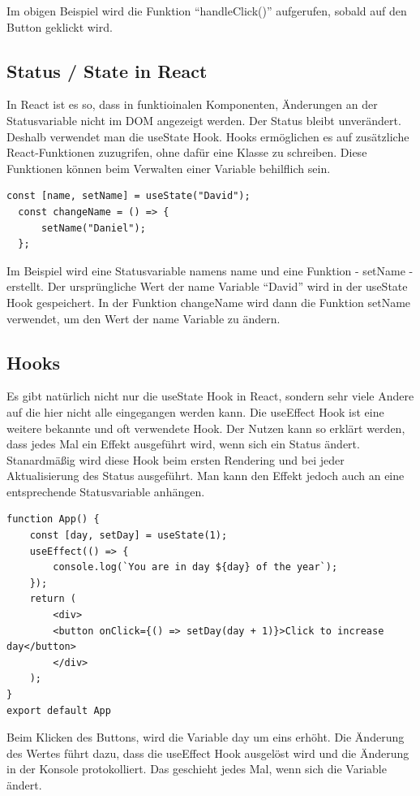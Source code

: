 Im obigen Beispiel wird die Funktion ``handleClick()'' aufgerufen, sobald auf den Button geklickt wird.


\subsection*{Status / State in React}
In React ist es so, dass in funktioinalen Komponenten, Änderungen an der Statusvariable nicht im DOM angezeigt werden. 
Der Status bleibt unverändert. 
\\
Deshalb verwendet man die useState Hook. Hooks ermöglichen es auf zusätzliche React-Funktionen zuzugrifen, ohne 
dafür eine Klasse zu schreiben. Diese Funktionen können beim Verwalten einer Variable behilflich sein.
\begin{lstlisting}[caption=State von Variablen in React]
  const [name, setName] = useState("David");
  const changeName = () => {
      setName("Daniel");
  };
\end{lstlisting}

Im Beispiel wird eine Statusvariable namens name und eine Funktion - setName - erstellt. Der ursprüngliche Wert der name Variable
``David'' wird in der useState Hook gespeichert. In der Funktion changeName wird dann die Funktion setName verwendet, um den Wert
der name Variable zu ändern.

\subsection*{Hooks}
Es gibt natürlich nicht nur die useState Hook in React, sondern sehr viele Andere auf die hier nicht alle eingegangen werden kann.
Die useEffect Hook ist eine weitere bekannte und oft verwendete Hook.
Der Nutzen kann so erklärt werden, dass jedes Mal ein Effekt ausgeführt wird, wenn sich ein Status ändert.
Stanardmäßig wird diese Hook beim ersten Rendering und bei jeder Aktualisierung des Status ausgeführt. 
Man kann den Effekt jedoch auch an eine entsprechende Statusvariable anhängen.

\begin{lstlisting}[caption=Hook in React]
  function App() {
    const [day, setDay] = useState(1);
    useEffect(() => {
        console.log(`You are in day ${day} of the year`);
    });
    return (
        <div>
        <button onClick={() => setDay(day + 1)}>Click to increase day</button>
        </div>
    );
}
export default App
\end{lstlisting}
Beim Klicken des Buttons, wird die Variable day um eins erhöht. Die Änderung des Wertes führt dazu, dass die useEffect Hook
ausgelöst wird und die Änderung in der Konsole protokolliert. Das geschieht jedes Mal, wenn sich die Variable ändert.

